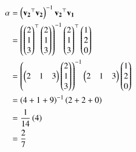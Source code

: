 \documentclass[journal]{IEEEtran}
\begin{document}
     \begin{align}
\alpha&=\left(\mathbf{v_2}^\top\mathbf{v_2}\right)^{-1}\mathbf{v_2}^\top\mathbf{v_1} \\
    &= \left(\begin{pmatrix}2\\1\\3\end{pmatrix}^\top\begin{pmatrix}2\\1\\3\end{pmatrix}\right)^{-1}\begin{pmatrix}2\\1\\3\end{pmatrix}^\top\begin{pmatrix}1\\2\\0\end{pmatrix} \\
     &= \left(\begin{pmatrix}2&1&3\end{pmatrix}\begin{pmatrix}2\\1\\3\end{pmatrix}\right)^{-1}\begin{pmatrix}2&1&3\end{pmatrix}\begin{pmatrix}1\\2\\0\end{pmatrix} \\
     &=\left(4+1+9\right)^{-1}\left(2+2+0\right)\\
     &=\frac{1}{14}\left(4\right)\\
     &=\frac{2}{7}
 \end{align}
 
 
\end{document}
